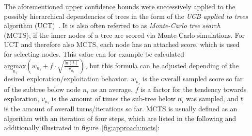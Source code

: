 The aforementioned upper confidence bounds were successively applied to the possibly hierarchical dependencies of trees in the form of the \textit{UCB applied to trees} algorithm (UCT)~\cite{Kocsis-UCT}.
It is also often referred to as \textit{Monte-Carlo tree search} (MCTS), if the inner nodes of a tree are scored via Monte-Carlo simulations.\newline
For UCT and therefore also MCTS, each node has an attached score, which is used for selecting nodes.
This value can for example be calculated $\underset{n_i}{\textrm{argmax}} \left( w_{n_i} + f \cdot \sqrt{\frac{\textrm{ln}(t)}{v_{n_i}}} \right)$, but this formula can be adjusted depending of the desired exploration/exploitation behavior.
$w_{n_i}$ is the overall sampled score so far of the subtree below node $n_i$ as an average, $f$ is a factor for the tendency towards exploration, $v_{n_i}$ is the amount of times the sub-tree below $n_i$ was sampled, and $t$ is the amount of overall turns/iterations so far.\newline
MCTS is usually defined as an algorithm with an iteration of four steps, which are listed in the following and additionally illustrated in figure~\ref{fig:approach:mcts}:
